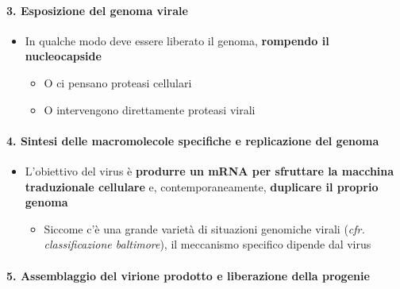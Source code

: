 \documentclass[italian,]{article}
\providecommand{\tightlist}{%
  \setlength{\itemsep}{0pt}\setlength{\parskip}{0pt}}
\begin{document}
\hypertarget{esposizione-del-genoma-virale}{%
\paragraph{3. Esposizione del genoma
virale}\label{esposizione-del-genoma-virale}}

\begin{itemize}
\tightlist
\item
  In qualche modo deve essere liberato il genoma, \textbf{rompendo il
  nucleocapside}

  \begin{itemize}
  \tightlist
  \item
    O ci pensano proteasi cellulari
  \item
    O intervengono direttamente proteasi virali
  \end{itemize}
\end{itemize}

\hypertarget{sintesi-delle-macromolecole-specifiche-e-replicazione-del-genoma}{%
\paragraph{4. Sintesi delle macromolecole specifiche e replicazione del
genoma}\label{sintesi-delle-macromolecole-specifiche-e-replicazione-del-genoma}}

\begin{itemize}
\tightlist
\item
  L'obiettivo del virus è \textbf{produrre un mRNA per sfruttare la
  macchina traduzionale cellulare} e, contemporaneamente,
  \textbf{duplicare il proprio genoma}

  \begin{itemize}
  \tightlist
  \item
    Siccome c'è una grande varietà di situazioni genomiche virali
    (\emph{cfr. classificazione baltimore}), il meccanismo specifico
    dipende dal virus
  \end{itemize}
\end{itemize}

\hypertarget{assemblaggio-del-virione-prodotto-e-liberazione-della-progenie}{%
\paragraph{5. Assemblaggio del virione prodotto e liberazione della
progenie}\label{assemblaggio-del-virione-prodotto-e-liberazione-della-progenie}}
\end{document}
